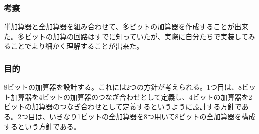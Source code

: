 \documentclass[a4paper]{jarticle}
\begin{document}
\subsubsection{考察}
半加算器と全加算器を組み合わせて、多ビットの加算器を作成することが出来た。多ビットの加算の回路はすでに知っていたが、実際に自分たちで実装してみることでより細かく理解することが出来た。

\subsubsection{目的}
8ビットの加算器を設計する。これには2つの方針が考えられる。1つ目は、8ビット加算器を4ビットの加算器のつなぎ合わせとして定義し、4ビットの加算器を2ビットの加算器のつなぎ合わせとして定義するというように設計する方針である。2つ目は、いきなり1ビットの全加算器を8つ用いて8ビットの全加算器を構成するという方針である。
\end{document}
